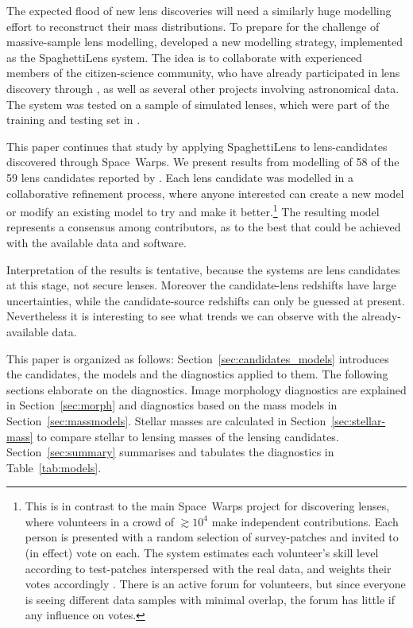 The expected flood of new lens discoveries will need a similarly huge
modelling effort to reconstruct their mass distributions.  To prepare
for the challenge of massive-sample lens modelling,
\cite{2015MNRAS.447.2170K} developed a new modelling strategy,
implemented as the SpaghettiLens system.  The idea is to collaborate
with experienced members of the citizen-science community, who have
already participated in lens discovery through \SW, as well as several
other projects involving astronomical data.  The system was tested on
a sample of simulated lenses, which were part of the training and
testing set in \SW.

This paper continues that study by applying SpaghettiLens to
lens-candidates discovered through Space~Warps.  We present results
from modelling of 58 of the 59 lens candidates reported by
\cite{2016MNRAS.455.1191M}.  Each lens candidate was modelled in a
collaborative refinement process, where anyone interested can create a
new model or modify an existing model to try and make it
better.\footnote{This is in contrast to the main Space~Warps project
  for discovering lenses, where volunteers in a crowd of $\gtrsim10^4$
  make independent contributions.  Each person is presented with a
  random selection of survey-patches and invited to (in effect) vote
  on each.  The system estimates each volunteer's skill level
  according to test-patches interspersed with the real data, and
  weights their votes accordingly \citep{2016MNRAS.455.1171M}.  There
  is an active forum for volunteers, but since everyone is seeing
  different data samples with minimal overlap, the forum has little if
  any influence on votes.}  The resulting model represents a consensus
among contributors, as to the best that could be achieved with the
available data and software.

Interpretation of the results is tentative,
because the systems are lens candidates at this stage, not secure lenses.
Moreover the candidate-lens redshifts have large uncertainties, while
the candidate-source redshifts can only be guessed at present.
Nevertheless it is interesting to see what trends we can observe with
the already-available data.

This paper is organized as follows:
Section~\ref{sec:candidates_models} introduces the candidates, the models and the diagnostics applied to them.
The following sections elaborate on the diagnostics.
Image morphology diagnostics are explained in Section~\ref{sec:morph} and
diagnostics based on the mass models in Section~\ref{sec:massmodels}.
Stellar masses are calculated in Section~\ref{sec:stellar-mass} to compare stellar to lensing masses of the lensing candidates.
Section~\ref{sec:summary} summarises and tabulates the diagnostics in
Table~\ref{tab:models}.

